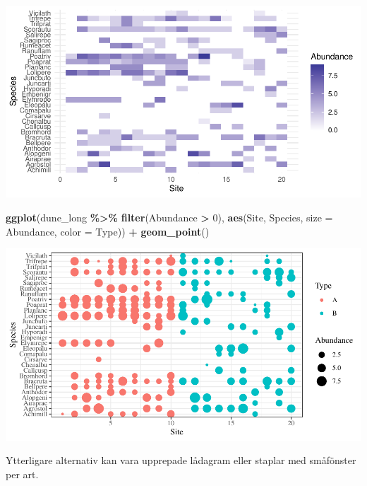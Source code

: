 \documentclass[
]{book}
\newenvironment{Shaded}{\begin{snugshade}}{\end{snugshade}}
\newcommand{\AttributeTok}[1]{\textcolor[rgb]{0.13,0.29,0.53}{#1}}
\newcommand{\DecValTok}[1]{\textcolor[rgb]{0.00,0.00,0.81}{#1}}
\newcommand{\FunctionTok}[1]{\textcolor[rgb]{0.13,0.29,0.53}{\textbf{#1}}}
\newcommand{\NormalTok}[1]{#1}
\newcommand{\SpecialCharTok}[1]{\textcolor[rgb]{0.81,0.36,0.00}{\textbf{#1}}}
\theoremstyle{definition}
\theoremstyle{definition}
\theoremstyle{definition}
\theoremstyle{definition}
\theoremstyle{remark}
\begin{document}
\begin{center}\includegraphics{R-anvisningar_files/figure-latex/unnamed-chunk-251-1} \end{center}

\begin{Shaded}
\begin{Highlighting}[]
\FunctionTok{ggplot}\NormalTok{(dune\_long }\SpecialCharTok{\%\textgreater{}\%} \FunctionTok{filter}\NormalTok{(Abundance }\SpecialCharTok{\textgreater{}} \DecValTok{0}\NormalTok{), }\FunctionTok{aes}\NormalTok{(Site, Species, }\AttributeTok{size =}\NormalTok{ Abundance, }\AttributeTok{color =}\NormalTok{ Type)) }\SpecialCharTok{+}
  \FunctionTok{geom\_point}\NormalTok{()}
\end{Highlighting}
\end{Shaded}

\begin{center}\includegraphics{R-anvisningar_files/figure-latex/unnamed-chunk-251-2} \end{center}

Ytterligare alternativ kan vara upprepade lådagram eller staplar med småfönster per art.
\end{document}
